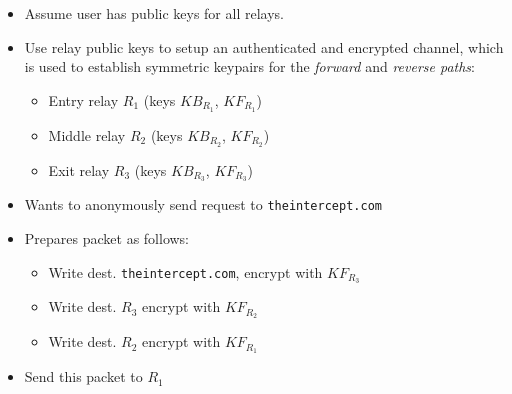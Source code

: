 \begin{frame}
\begin{columns}
\begin{tikzpicture}
    \end{tikzpicture}%

    \begin{itemize}
      \item Assume user has public keys for all relays.
      \item<2-> Use relay public keys to setup an authenticated and encrypted
        channel, which is used to establish symmetric keypairs for the
        \emph{forward} and \emph{reverse paths}:
        \begin{itemize}
          \item Entry relay $R_1$ (keys $KB_{R_1}$, $KF_{R_1}$)
          \item Middle relay $R_2$ (keys $KB_{R_2}$, $KF_{R_2}$)
          \item Exit relay $R_3$ (keys $KB_{R_3}$, $KF_{R_3}$)
        \end{itemize}
      \item<3-> Wants to anonymously send request to \texttt{theintercept.com}
      \item<4-> Prepares packet as follows:
        \begin{itemize}
          \item<4-> Write dest. \texttt{theintercept.com}, encrypt with $KF_{R_3}$
          \item<5-> Write dest. $R_3$ encrypt with $KF_{R_2}$
          \item<6-> Write dest. $R_2$ encrypt with $KF_{R_1}$
        \end{itemize}
      \item<7-> Send this packet to $R_1$
    \end{itemize}
  \end{columns}
\end{frame}



